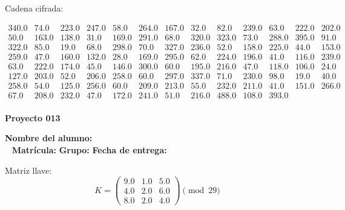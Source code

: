 \documentclass[12pt]{article}
\begin{document}
Cadena cifrada:
\begin{center}
$\begin{array}{lllllllllllll}
340.0 & 74.0 & 223.0 & 247.0 & 58.0 & 264.0 & 167.0 & 32.0 & 82.0 & 239.0 & 63.0 & 222.0 & 202.0\\
50.0 & 163.0 & 138.0 & 31.0 & 169.0 & 291.0 & 68.0 & 320.0 & 323.0 & 73.0 & 288.0 & 395.0 & 91.0\\
322.0 & 85.0 & 19.0 & 68.0 & 298.0 & 70.0 & 327.0 & 236.0 & 52.0 & 158.0 & 225.0 & 44.0 & 153.0\\
259.0 & 47.0 & 160.0 & 132.0 & 28.0 & 169.0 & 295.0 & 62.0 & 224.0 & 196.0 & 41.0 & 116.0 & 239.0\\
63.0 & 222.0 & 174.0 & 45.0 & 146.0 & 300.0 & 60.0 & 195.0 & 216.0 & 47.0 & 118.0 & 106.0 & 24.0\\
127.0 & 203.0 & 52.0 & 206.0 & 258.0 & 60.0 & 297.0 & 337.0 & 71.0 & 230.0 & 98.0 & 19.0 & 40.0\\
258.0 & 54.0 & 125.0 & 256.0 & 60.0 & 209.0 & 213.0 & 55.0 & 232.0 & 211.0 & 41.0 & 151.0 & 266.0\\
67.0 & 208.0 & 232.0 & 47.0 & 172.0 & 241.0 & 51.0 & 216.0 & 488.0 & 108.0 & 393.0\\
\end{array}$
\end{center}

\newpage


\textbf{Proyecto 013}

\textbf{Nombre del alumno:} \underline{\hspace{13cm}}\\\
\vspace{1cm}
\textbf{Matrícula:} \underline{\hspace{4cm}} \hspace{1cm}
\textbf{Grupo:} \underline{\hspace{2cm}}
\textbf{Fecha de entrega:} \underline{\hspace{2cm}}

\medskip

Matriz llave:
\[
K = \begin{pmatrix}
9.0 & 1.0 & 5.0\\
4.0 & 2.0 & 6.0\\
8.0 & 2.0 & 4.0
\end{pmatrix} \pmod{29}
\]
\end{document}
